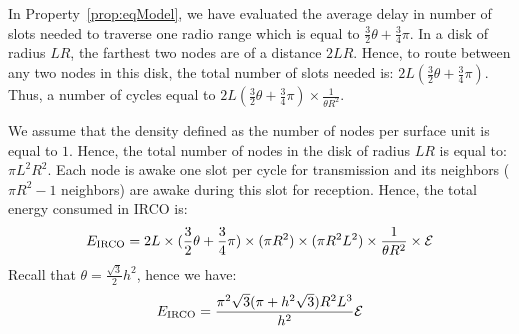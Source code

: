 In Property~\ref{prop:eqModel}, we have evaluated the average delay in number of slots needed to traverse one radio range which is equal to $\frac{3}{2}\theta + \frac{3}{4}\pi$. In a disk of radius $LR$, the farthest two nodes are of a distance $2LR$. Hence, to route between any two nodes
in this disk, the total number of slots needed is: $ 2L  (\frac{3}{2}\theta + \frac{3}{4}\pi)$. Thus, a number of cycles equal to $ 2L  (\frac{3}{2}\theta + \frac{3}{4}\pi) \times \frac{1}{\theta R^2}$.

We assume that the density defined as the number of nodes per surface unit is equal to $1$. Hence, the total number of nodes in the disk of radius $LR$ is equal to: $\pi L^2R^2$. Each node is awake one slot per cycle for transmission and its neighbors ($\pi R^2 - 1$ neighbors) are awake during this slot for reception. Hence, the total energy consumed in IRCO is:
\begin{equation}
E_\mathrm{IRCO} = 2L\times(\frac{3}{2}\theta+\frac{3}{4}\pi)\times (\pi R^2)\times (\pi R^2 L^2) \times \frac{1}{\theta R^2} \times \mathcal{E} 
\end{equation}
Recall that $\theta=\frac{\sqrt{3}}{2}h^2$, hence we have:
\begin{equation}
E_\mathrm{IRCO} = \frac{\pi^2 \sqrt{3}(\pi + h^2 \sqrt{3}) R^2 L^3}{h^2}\mathcal{E}
\end{equation}

\begin{comment}
During any slot, all nodes having the associated color are awake as well as their neighbors ($\pi R^2$ nodes). The number of nodes of a given color (slot) is equal to the density of a color which is given by $\frac{1}{\theta R^2}$ multiplied by the total number of nodes in the disk ($\pi R^2L^2$). The total energy consumed in IRCO is:
\begin{equation}
E_\mathrm{IRCO} = 2L\times(\frac{3}{2}\theta+\frac{3}{4}\pi)\times (\pi R^2)\times (\pi R^2 L^2) \times \frac{1}{\theta R^2} \times \cE 
\end{equation}
Recall that $\theta=\frac{\sqrt{3}}{2}h^2$, hence we have:
\begin{equation}
E_\mathrm{IRCO} = \frac{\pi^2 \sqrt{3}(\pi + h^2 \sqrt{3}) R^2 L^3}{h^2}\cE
\end{equation}
\end{comment}
\begin{comment}
Using this result, we can estimate the number of cycles needed by IRCO to route between any pair of nodes in the disk of radius.
Since one node plus all its neighbors is active at every slot, this yield an estimate of the energy consumption
of IRCO:
\begin{equation}
E_\mathrm{IRCO} = \frac{\pi \sqrt{3}(\pi + h^2 \sqrt{3}) R^2 L^3}{h^2}\cE
\end{equation}
\end{comment}


